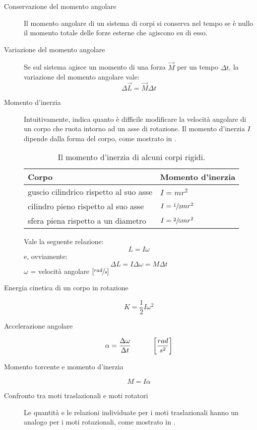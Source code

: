 \documentclass[a4paper,11pt,italian]{article}
\begin{document}
\begin{description}
  \item[Conservazione del momento angolare] 
  Il momento angolare di un sistema di corpi si conserva nel tempo se è nullo il momento totale delle forze esterne che agiscono su di esso.
  
  \item[Variazione del momento angolare] 
  Se sul sistema agisce un momento di una forza $ \vec{M} $ per un tempo $ \Delta t $, la variazione del momento angolare vale:
  \[ \Delta \vec{L} = \vec{M}\Delta t \]
  
  \item[Momento d'inerzia] 
  Intuitivamente, indica quanto è difficile modificare la velocità angolare di un corpo che ruota intorno ad un asse di rotazione. 
  Il momento d'inerzia $ I $ dipende dalla forma del corpo, come mostrato in .
  
  \begin{table}[htp]\centering
    \begin{tabular}{ll}\toprule
     \textbf{Corpo} & \textbf{Momento d'inerzia} \\\midrule
     guscio cilindrico rispetto al suo asse & $ I = mr^2 $ \\\addlinespace[.2em]
     cilindro pieno rispetto al suo asse & $ I = \sfrac{1}{2} mr^2 $ \\\addlinespace[.2em]
     sfera piena rispetto a un diametro & $ I = \sfrac{2}{5} mr^2 $ \\\bottomrule
    \end{tabular}
    \caption{Il momento d'inerzia di alcuni corpi rigidi.}
    \label{tab:momentoinerzia}
  \end{table}
  
  Vale la seguente relazione:
  \[ L = I\omega \]
  e, ovviamente:
  \[ \Delta L = I\Delta\omega = M \Delta t \]
  $ \omega $ = velocità angolare $ [\sfrac{rad}{s}] $
  
  \item[Energia cinetica di un corpo in rotazione]
  \[ K = \frac{1}{2}I\omega^2 \]
  
  \item[Accelerazione angolare]
  \[ \alpha = \frac{\Delta \omega}{\Delta t} \hspace*{3em} \left[ \frac{rad}{s^2} \right] \]
  
  \item[Momento torcente e momento d'inerzia]
  \[ M = I \alpha \]
  
  \item[Confronto tra moti traslazionali e moti rotatori] 
  Le quantità e le relazioni individuate per i moti traslazionali hanno un analogo per i moti rotazionali, come mostrato in .


\end{description}
\end{document}
